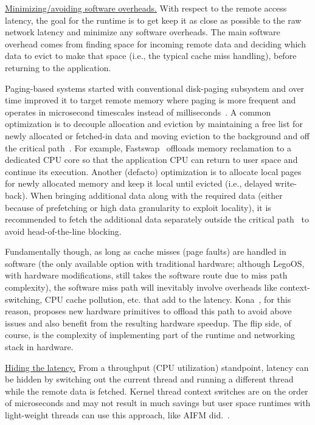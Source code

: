 \vspace{3pt}
\noindent \uline{Minimizing/avoiding software overheads.}
With respect to the remote access latency, the goal for the 
runtime is to get keep it as close as possible to the raw network 
latency and minimize any software overheads. The main software 
overhead comes from finding space for incoming remote data 
and deciding which data to evict to make that space 
(i.e., the typical cache miss handling), before returning to 
the application. 

Paging-based systems started with conventional disk-paging 
subsystem and over time improved it to target remote memory
where paging is more frequent and operates in microsecond 
timescales instead of milliseconds~\cite{Lim2012}. A common 
optimization is to decouple allocation and eviction by 
maintaining a free list for newly allocated or fetched-in 
data and moving eviction to the background and off the 
critical path~\cite{Lim2012,leap}. 
For example, Fastswap~\cite{fastswap} offloads  
memory reclamation to a dedicated CPU core so that the 
application CPU can return to user space and continue its 
execution. Another (defacto) optimization is to allocate 
local pages for newly allocated memory and keep it local until 
evicted (i.e., delayed write-back).
When bringing additional data along with the required data
(either because of prefetching or high data granularity to 
exploit locality), it is recommended to fetch the additional 
data separately outside the critical path~\cite{fastswap} to 
avoid head-of-the-line blocking.

Fundamentally though, as long as cache misses (page faults) are 
handled in software (the only available option with 
traditional hardware; although LegoOS, with hardware modifications, 
still takes the software route due to miss path complexity), 
the software miss path will inevitably involve overheads like 
context-switching, CPU cache pollution, etc. that add to the latency. 
Kona~\cite{kona}, for this reason, proposes new hardware 
primitives to offload this path to avoid above issues and also 
benefit from the resulting hardware speedup. The flip side, 
of course, is the complexity of implementing part of the 
runtime and networking stack in hardware.

\vspace{3pt}
\noindent \uline{Hiding the latency.}
From a throughput (CPU utilization) standpoint, latency 
can be hidden by switching out the current thread and 
running a different thread while the remote data is fetched.
Kernel thread context switches are on the order of 
microseconds and may not result in much savings 
but user space runtimes with light-weight 
threads can use this approach, like AIFM did.~\cite{aifm}.

